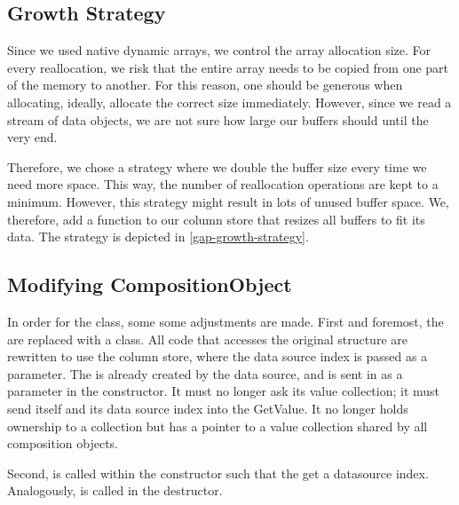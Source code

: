\subsection{Growth Strategy}
\label{sub:Growth Strategy}
Since we used native dynamic arrays, we control the array allocation size. For every reallocation, we risk that the entire array needs to be copied from one part of the memory to another. For this reason, one should be generous when allocating, ideally, allocate the correct size immediately. However, since we read a stream of data objects, we are not sure how large our buffers should until the very end. 

Therefore, we chose a strategy where we double the buffer size every time we need more space. This way, the number of reallocation operations are kept to a minimum. However, this strategy might result in lots of unused buffer space. We, therefore, add a  function to our column store that resizes all buffers to fit its data. The strategy is depicted in \ref{gap-growth-strategy}.

\subsection{Modifying CompositionObject}
\label{sub:Modifying CompositionObject}
In order for the  class, some some adjustments are made. First and foremost, the  are replaced with a  class. All code that accesses the original structure are rewritten to use the column store, where the data source index is passed as a parameter. The  is already created by the data source, and is sent in as a parameter in the constructor. It must no longer ask its value collection; it must send itself and its data source index into the GetValue. It no longer holds ownership to a collection but has a pointer to a value collection shared by all composition objects.

Second,  is called within the constructor such that the  get a datasource index. Analogously,  is called in the destructor.

